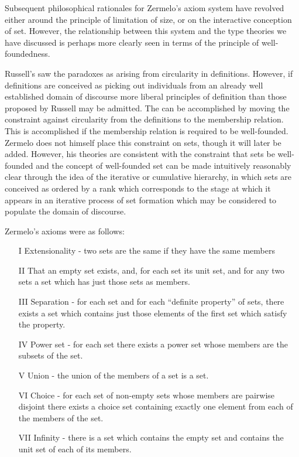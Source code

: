 \documentclass[10pt,titlepage]{book}
\begin{document}
Subsequent philosophical rationales for Zermelo's axiom system have revolved either around the principle of limitation of size, or on the interactive conception of set.
However, the relationship between this system and the type theories we have discussed is perhaps more clearly seen in terms of the principle of well-foundedness.

Russell's saw the paradoxes as arising from circularity in definitions.
However, if definitions are conceived as picking out individuals from an already well established domain of discourse more liberal principles of definition than those proposed by Russell may be admitted.
The can be accomplished by moving the constraint against circularity from the definitions to the membership relation.
This is accomplished if the membership relation is required to be well-founded.
Zermelo does not himself place this constraint on sets, though it will later be added.
However, his theories are consistent with the constraint that sets be well-founded and the concept of well-founded set can be made intuitively reasonably clear through the idea of the iterative or cumulative hierarchy, in which sets are conceived as ordered by a rank which corresponds to the stage at which it appears in an iterative process of set formation which may be considered to populate the domain of discourse.

Zermelo's axioms were as follows:
\begin{itemize}
\item[I] Extensionality - two sets are the same if they have the same members
\item[II] That an empty set exists, and, for each set its unit set, and for any two sets a set which has just those sets as members.
\item[III] Separation - for each set and for each ``definite property'' of sets, there exists a set which contains just those elements of the first set which satisfy the property.
\item[IV] Power set - for each set there exists a power set whose members are the subsets of the set.
\item[V] Union - the union of the members of a set is a set.
\item[VI] Choice - for each set of non-empty sets whose members are pairwise disjoint there exists a choice set containing exactly one element from each of the members of the set.
\item[VII] Infinity - there is a set which contains the empty set and contains the unit set of each of its members.
\end{itemize}
\end{document}
